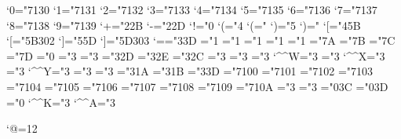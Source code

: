 \mathcode`0="7130
\mathcode`1="7131
\mathcode`2="7132
\mathcode`3="7133
\mathcode`4="7134
\mathcode`5="7135
\mathcode`6="7136
\mathcode`7="7137
\mathcode`8="7138
\mathcode`9="7139
\mathcode`+="2\frfam@2B
\mathcode`-="2\frfam@2D
\mathcode`!="0
\mathcode`(="4 \delcode`(="
\mathcode`)="5 \delcode`)="
\mathcode`[="4\frfam@5B \delcode`[="\frfam@5B302
\mathcode`]="5\frfam@5D \delcode`]="\frfam@5D303
\mathcode`=="3\frfam@3D
\mathchardef\intop="1
\mathchardef\ointop="1
\mathchardef\coprod="1
\mathchardef\prod="1
\mathchardef\sum="1
\mathchardef\braceld="\euexfam@7A \mathchardef\bracerd="\euexfam@7B
\mathchardef\bracelu="\euexfam@7C \mathchardef\braceru="\euexfam@7D
\mathchardef\infty="0
\mathchardef\nearrow="3
\mathchardef\searrow="3
\mathchardef\nwarrow="3\euexfam@2D
\mathchardef\swarrow="3\euexfam@2E
\mathchardef\Leftrightarrow="3\euexfam@2C
\mathchardef\Leftarrow="3
\mathchardef\Rightarrow="3
\mathchardef\leftrightarrow="3 \mathcode`\^^W="3
\mathchardef\leftarrow="3 \let\gets=\leftarrow \mathcode`\^^X="3
\mathchardef\rightarrow="3 \let\to=\rightarrow \mathcode`\^^Y="3
\mathchardef\leftharpoonup="3
\mathchardef\leftharpoondown="3
\mathchardef\rightharpoonup="3\euexfam@1A
\mathchardef\rightharpoondown="3\euexfam@1B
\mathchardef\Relbar="3\eqfam@3D %
\mathchardef\Gamma="7100
\mathchardef\Delta="7101
\mathchardef\Theta="7102
\mathchardef\Lambda="7103
\mathchardef\Xi="7104
\mathchardef\Pi="7105
\mathchardef\Sigma="7106
\mathchardef\Upsilon="7107
\mathchardef\Phi="7108
\mathchardef\Psi="7109
\mathchardef\Omega="710A
\mathchardef\leq="3
\mathchardef\geq="3
\mathchardef\Re="0\scrfam@3C
\mathchardef\Im="0\scrfam@3D
\mathchardef\aleph="0
\def\uparrow{\delimiter"3\euexfam@22378 } \mathcode`\^^K="3
\def\downarrow{\delimiter"3\euexfam@23379 } \mathcode`\^^A="3
\def\updownarrow{\delimiter"3\euexfam@6C33F }
\def\Uparrow{\delimiter"3\euexfam@2A37E }
\def\Downarrow{\delimiter"3\euexfam@2B37F }
\def\Updownarrow{\delimiter"3\euexfam@6D377 }
\def\rbrace{\delimiter"5\scrfam@67\euexfam@09 } \let\}=\rbrace
\def\lbrace{\delimiter"4\scrfam@66\euexfam@08 } \let\{=\lbrace
\def\vert{\delimiter"\scrfam@6A30C }
\def\backslash{\delimiter"\scrfam@6E30F }
\let\varsigma=\sigma \let\varrho=\rho

\rm\catcode`@=12\endinput
